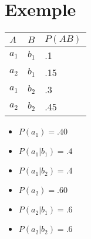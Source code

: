 \section{Exemple}
\begin{multicols}{2}
[]
\begin{tabular}{ll|l}
  \hline
  $A$&$B$&$P(AB)$\\
  \hline
  $a_1$&$b_1$&.1\\
  $a_2$&$b_1$&.15\\
  $a_1$&$b_2$&.3\\
  $a_2$&$b_2$&.45\\
  \hline
\end{tabular}

\begin{itemize}
\item $P(a_1) = .40$
\item $P(a_1|b_1) = .4$
\item $P(a_1|b_2) = .4$
\item $P(a_2) = .60$
\item $P(a_2|b_1) = .6$
\item $P(a_2|b_2) = .6$
\end{itemize}

\end{multicols}